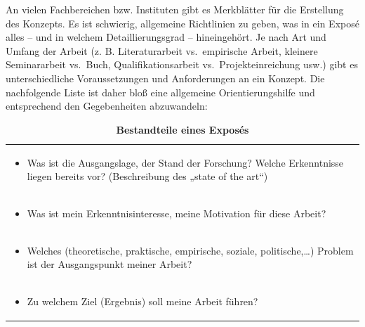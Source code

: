 \documentclass[]{book}
\providecommand{\tightlist}{%
  \setlength{\itemsep}{0pt}\setlength{\parskip}{0pt}}
\theoremstyle{definition}
\theoremstyle{definition}
\theoremstyle{definition}
\theoremstyle{remark}
\begin{document}
An vielen Fachbereichen bzw. Instituten gibt es Merkblätter für die
Erstellung des Konzepts. Es ist schwierig, allgemeine Richtlinien zu
geben, was in ein Exposé alles -- und in welchem Detaillierungsgrad --
hineingehört. Je nach Art und Umfang der Arbeit (z. B. Literaturarbeit
vs.~empirische Arbeit, kleinere Seminararbeit vs.~Buch,
Qualifikationsarbeit vs.~Projekteinreichung usw.) gibt es
unterschiedliche Voraussetzungen und Anforderungen an ein Konzept. Die
nachfolgende Liste ist daher bloß eine allgemeine Orientierungshilfe und
entsprechend den Gegebenheiten abzuwandeln:

\begin{longtable}[]{@{}l@{}}
\caption{\textbf{\label{tab:expose} Bestandteile eines
Exposés}}\tabularnewline
\toprule
\begin{minipage}[t]{0.97\columnwidth}\raggedright\strut
\begin{itemize}
\tightlist
\item
  Was ist die Ausgangslage, der Stand der Forschung? Welche Erkenntnisse
  liegen bereits vor? (Beschreibung des „state of the art``)
  \vspace{-6mm}
\end{itemize}\strut
\end{minipage}\tabularnewline
\begin{minipage}[t]{0.97\columnwidth}\raggedright\strut
\begin{itemize}
\tightlist
\item
  Was ist mein Erkenntnisinteresse, meine Motivation für diese Arbeit?
  \vspace{-6mm}
\end{itemize}\strut
\end{minipage}\tabularnewline
\begin{minipage}[t]{0.97\columnwidth}\raggedright\strut
\begin{itemize}
\tightlist
\item
  Welches (theoretische, praktische, empirische, soziale,
  politische,\ldots{}) Problem ist der Ausgangspunkt meiner Arbeit?
  \vspace{-6mm}
\end{itemize}\strut
\end{minipage}\tabularnewline
\begin{minipage}[t]{0.97\columnwidth}\raggedright\strut
\begin{itemize}
\tightlist
\item
  Zu welchem Ziel (Ergebnis) soll meine Arbeit führen? \vspace{-6mm}

\end{itemize}
\end{minipage}
\end{longtable}
\end{document}
